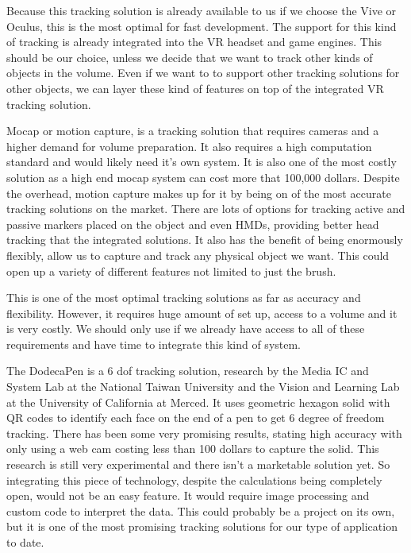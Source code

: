 \documentclass[onecolumn, draftclsnofoot,10pt, compsoc]{IEEEtran}
\newcounter{threesection}[subsubsection]
\begin{document}
Because this tracking solution is already available to us if we choose the Vive or Oculus, this is the most optimal for fast development. The support for this kind of tracking is already integrated into the VR headset and game engines. This should be our choice, unless we decide that we want to track other kinds of objects in the volume. Even if we want to to support other tracking solutions for other objects, we can layer these kind of features on top of the integrated VR tracking solution.  

Mocap or motion capture, is a tracking solution that requires cameras and a higher demand for volume preparation. It also requires a high computation standard and would likely need it's own system. It is also one of the most costly solution as a high end mocap system can cost more that 100,000 dollars. Despite the overhead, motion capture makes up for it by being on of the most accurate tracking solutions on the market. There are lots of options for tracking active and passive markers placed on the object and even HMDs, providing better head tracking that the integrated solutions. It also has the benefit of being enormously flexibly, allow us to capture and track any physical object we want. This could open up a variety of different features not limited to just the brush. 

This is one of the most optimal tracking solutions as far as accuracy and flexibility. However, it requires huge amount of set up, access to a volume and it is very costly. We should only use if we already have access to all of these requirements and have time to integrate this kind of system. 

The DodecaPen is a 6 dof tracking solution, research by the Media IC and System Lab at the National Taiwan University and the Vision and Learning Lab at the University of California at Merced. It uses geometric hexagon solid with QR codes to identify each face on the end of a pen to get 6 degree of freedom tracking. There has been some very promising results, stating high accuracy with only using a web cam costing less than 100 dollars to capture the solid. This research is still very experimental and there isn't a marketable solution yet. So integrating this piece of technology, despite the calculations being completely open, would not be an easy feature. It would require image processing and custom code to interpret the data. This could probably be a project on its own, but it is one of the most promising tracking solutions for our type of application to date. 
\end{document}
